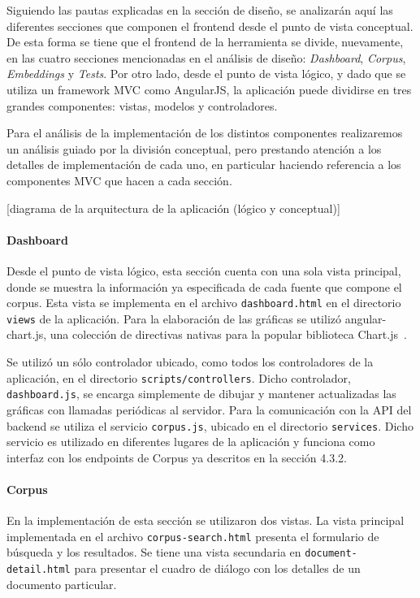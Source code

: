 Siguiendo las pautas explicadas en la sección de diseño, se analizarán aquí las diferentes secciones que
componen el frontend desde el punto de vista conceptual. De esta forma se tiene que el frontend de la
herramienta se divide, nuevamente, en las cuatro secciones mencionadas en el análisis de diseño:
\textit{Dashboard}, \textit{Corpus}, \textit{Embeddings} y \textit{Tests}. Por otro lado, desde el punto
de vista lógico, y dado que se utiliza un framework MVC como AngularJS, la aplicación puede dividirse en
tres grandes componentes: vistas, modelos y controladores.

Para el análisis de la implementación de los distintos componentes realizaremos un análisis guiado por la
división conceptual, pero prestando atención a los detalles de implementación de cada uno, en
particular haciendo referencia a los componentes MVC que hacen a cada sección.

[diagrama de la arquitectura de la aplicación (lógico y conceptual)]

\paragraph{Dashboard}

Desde el punto de vista lógico, esta sección cuenta con una sola vista principal, donde se muestra la
información ya especificada de cada fuente que compone el corpus. Esta vista se implementa en el archivo
\texttt{dashboard.html} en el directorio \texttt{views} de la aplicación. Para la elaboración de las
gráficas se utilizó angular-chart.js, una colección de directivas nativas para la popular biblioteca
Chart.js~\cite{Chartjs}.

Se utilizó un sólo controlador ubicado, como todos los controladores de la aplicación, en el directorio
\texttt{scripts/controllers}. Dicho controlador, \texttt{dashboard.js}, se encarga simplemente de dibujar
y mantener actualizadas las gráficas con llamadas periódicas al servidor. Para la comunicación con la
API del backend se utiliza el servicio \texttt{corpus.js}, ubicado en el directorio \texttt{services}. Dicho
servicio es utilizado en diferentes lugares de la aplicación y funciona como interfaz con los endpoints
de Corpus ya descritos en la sección 4.3.2.

\paragraph{Corpus}

En la implementación de esta sección se utilizaron dos vistas. La vista principal implementada en el
archivo \texttt{corpus-search.html} presenta el formulario de búsqueda y los resultados. Se tiene una
vista secundaria en \texttt{document-detail.html} para presentar el cuadro de diálogo con los detalles
de un documento particular.

